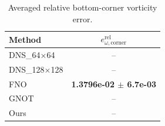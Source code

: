 \begin{table}[t]
\centering
\caption{Averaged relative bottom-corner vorticity error.}
\label{tab:corner_vorticity_relative_l2}
\begin{tabular}{lc}
\toprule
Method & $e^{\mathrm{rel}}_{\omega,\mathrm{corner}}$ \\
\midrule
DNS\_64$\times$64 & -- \\
DNS\_128$\times$128 & -- \\
FNO & \textbf{1.3796e-02 $\pm$ 6.7e-03} \\
GNOT & -- \\
Ours & -- \\
\bottomrule
\end{tabular}
\end{table}